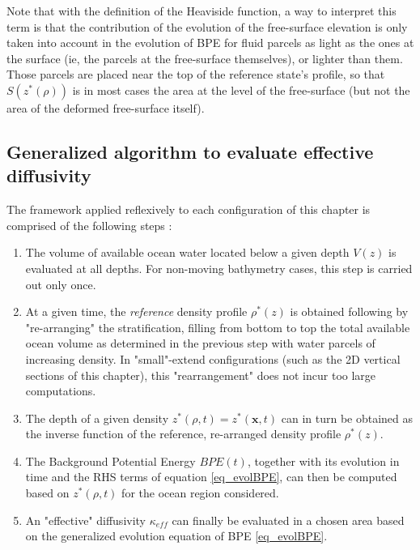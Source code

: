 Note that with the definition of the Heaviside function, a way to interpret this term is that the contribution of the evolution of the free-surface elevation is only taken into account in the evolution of BPE for fluid parcels as light as the ones at the surface (ie, the parcels at the free-surface themselves), or lighter than them. Those parcels are placed near the top of the reference state's profile, so that $S(z^*(\rho))$ is in most cases the area at the level of the free-surface (but not the area of the deformed free-surface itself).
\color{black}
\subsection{Generalized algorithm to evaluate effective diffusivity}
\label{BPE_algo}
The framework applied reflexively to each configuration of this chapter is comprised of the following steps : 
\begin{enumerate}
\setlength\itemsep{0pt}
\item The volume of available ocean water located below a given depth $V(z)$ is evaluated at all depths. For non-moving bathymetry cases, this step is carried out only once. 
\item At a given time, the \textit{reference} density profile $\rho^*(z)$ is obtained following \citet{winters_available_1995} by "re-arranging" the stratification, filling from bottom to top the total available ocean volume as determined in the previous step with water parcels of increasing density. In "small"-extend configurations (such as the 2D vertical sections of this chapter), this "rearrangement" does not incur too large computations.%
\item The depth of a given density $z^*(\rho,t)=z^*(\mathbf{x},t)$ can in turn be obtained as the inverse function of the reference, re-arranged density profile $\rho^*(z)$. 
\item The Background Potential Energy $BPE(t)$, together with its evolution in time and the RHS terms of equation \ref{eq_evolBPE}, can then be computed based on $z^*(\rho,t)$ for the ocean region considered.
\item An "effective" diffusivity $\kappa_{eff}$ can finally be evaluated in a chosen area based on the generalized evolution equation of BPE \ref{eq_evolBPE}.
\end{enumerate}

